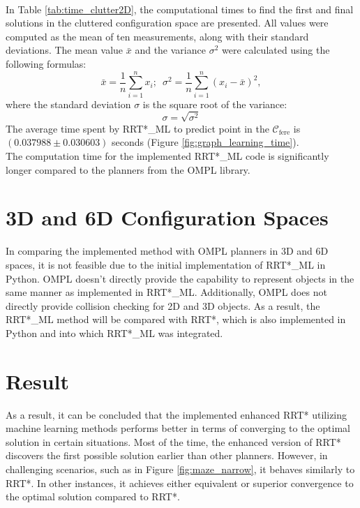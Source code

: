 \documentclass{ctuthesis}
\begin{document}
\\
In Table \ref{tab:time_clutter2D}, 
the computational times to find the first and final solutions in the cluttered configuration space 
are presented. 
All values were computed as the mean of ten measurements, 
along with their standard deviations. 
The mean value $\bar{x}$ and the variance $\sigma^2$ were calculated using the following formulas:
\[
\bar{x} = \frac{1}{n} \sum_{i=1}^{n} x_i; \enspace \sigma^2 = \frac{1}{n} \sum_{i=1}^{n} (x_i - \bar{x})^2, 
\]
where the standard deviation $\sigma$ is the square root of the variance:
\[
\sigma = \sqrt{\sigma^2}
\] 
The average time spent by RRT*\_ML to predict point in the $\mathcal{C}_\text{fere}$ 
is $(0.037988 \pm 0.030603)$ seconds (Figure \ref{fig:graph_learning_time}). 
\\[12pt]
The computation time for the implemented RRT*\_ML code is significantly longer 
compared to the planners from the OMPL library. 

\section{3D and 6D Configuration Spaces}
In comparing the implemented method with OMPL planners in 3D and 6D spaces, 
it is not feasible due to the initial implementation of RRT*\_ML in Python. 
OMPL doesn't directly provide the capability to represent objects in the same manner 
as implemented in RRT*\_ML. 
Additionally, OMPL does not directly provide collision checking for 2D and 3D objects.
As a result, 
the RRT*\_ML method will be compared with RRT*, 
which is also implemented in Python and into which RRT*\_ML was integrated.
\clearpage
\section{Result}
As a result, 
it can be concluded that the implemented enhanced RRT* utilizing machine learning methods 
performs better in terms of converging to the optimal solution in certain situations. 
Most of the time, the enhanced version of RRT* discovers the first possible solution earlier 
than other planners. 
However, in challenging scenarios, such as in Figure \ref{fig:maze_narrow}, 
it behaves similarly to RRT*. 
In other instances, 
it achieves either equivalent or superior convergence to the optimal solution compared to RRT*.
\end{document}
